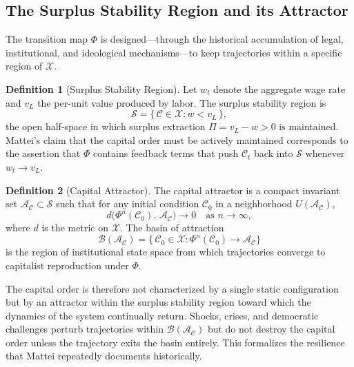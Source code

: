 \documentclass[12pt,a4paper]{article}
\theoremstyle{definition}
\newtheorem{definition}{Definition}[section]
\theoremstyle{remark}
\begin{document}
\subsection{The Surplus Stability Region and its Attractor}

The transition map $\Phi$ is designed---through the historical accumulation of legal, institutional, and ideological mechanisms---to keep trajectories within a specific region of $\mathcal{X}$.

\begin{definition}[Surplus Stability Region]
\label{def:stability_region}
Let $w_t$ denote the aggregate wage rate and $v_L$ the per-unit value produced by labor. The surplus stability region is
\begin{equation}
  \label{eq:surplus}
  \mathcal{S} = \bigl\{\, \mathcal{C} \in \mathcal{X} : w < v_L \,\bigr\},
\end{equation}
the open half-space in which surplus extraction $\Pi = v_L - w > 0$ is maintained. Mattei's claim that the capital order must be actively maintained corresponds to the assertion that $\Phi$ contains feedback terms that push $\mathcal{C}_t$ back into $\mathcal{S}$ whenever $w_t \to v_L$.
\end{definition}

\begin{definition}[Capital Attractor]
The capital attractor is a compact invariant set $\mathcal{A}_\mathcal{C} \subset \mathcal{S}$ such that for any initial condition $\mathcal{C}_0$ in a neighborhood $U(\mathcal{A}_\mathcal{C})$,
\begin{equation}
  d\!\bigl(\Phi^n(\mathcal{C}_0),\, \mathcal{A}_\mathcal{C}\bigr) \to 0 \quad \text{as } n \to \infty,
\end{equation}
where $d$ is the metric on $\mathcal{X}$. The basin of attraction
\begin{equation}
  \mathcal{B}(\mathcal{A}_\mathcal{C}) = \bigl\{\,\mathcal{C}_0 \in \mathcal{X} : \Phi^n(\mathcal{C}_0) \to \mathcal{A}_\mathcal{C}\bigr\}
\end{equation}
is the region of institutional state space from which trajectories converge to capitalist reproduction under $\Phi$.
\end{definition}

The capital order is therefore not characterized by a single static configuration but by an attractor within the surplus stability region toward which the dynamics of the system continually return. Shocks, crises, and democratic challenges perturb trajectories within $\mathcal{B}(\mathcal{A}_\mathcal{C})$ but do not destroy the capital order unless the trajectory exits the basin entirely. This formalizes the resilience that Mattei repeatedly documents historically.
\end{document}

